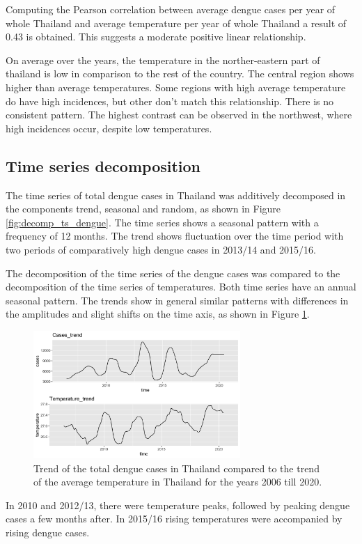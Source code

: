 Computing the Pearson correlation between average dengue cases per year of whole Thailand and average temperature per year of whole Thailand a result of 0.43 is obtained. This suggests a moderate positive linear relationship. 

On average over the years, the temperature in the norther-eastern part of thailand is low in comparison to the rest of the country. The central region shows higher than average temperatures. 
Some regions with high average temperature do have high incidences, but other don’t match this relationship. There is no consistent pattern. The highest contrast can be observed in the northwest, where high incidences occur, despite low temperatures.



	\subsection{Time series decomposition}The time series of total dengue cases in Thailand was additively decomposed in the components trend, seasonal and random, as shown in Figure \ref{fig:decomp_ts_dengue}. The time series shows a seasonal pattern with a frequency of 12 months. The trend shows fluctuation over the time period with two periods of comparatively high dengue cases in 2013/14 and 2015/16.
	
	The decomposition of the time series of the dengue cases was compared to the decomposition of the time series of temperatures. Both time series have an annual seasonal pattern. The trends show in general similar patterns with differences in the amplitudes and slight shifts on the time axis, as shown in Figure \ref{fig:Trend_temp_cases}.
	\begin{figure}[hbpt] 
		\centering
		\includegraphics[width=0.7\textwidth]{fig/Trend_temp_cases.png}
		\caption{Trend of the total dengue cases in Thailand compared to the trend of the average temperature in Thailand for the years 2006 till 2020.}
		\label{fig:Trend_temp_cases}
	\end{figure}
	 In 2010 and 2012/13, there were temperature peaks, followed by peaking dengue cases a few months after. In 2015/16 rising temperatures were accompanied by rising dengue cases. 

